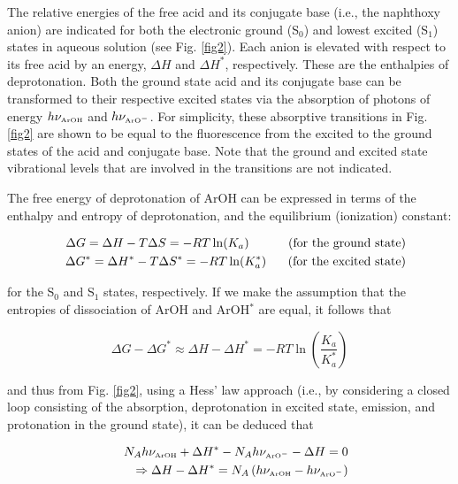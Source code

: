 \documentclass[byrevtex,amssymb,aps,pra,floatfix,letterpaper]{revtex4}
\begin{document}
The relative energies of the free acid and its conjugate base (i.e., the naphthoxy anion) are indicated for both the electronic ground (S$_0$) and lowest excited (S$_1$) states in aqueous solution (see Fig. \ref{fig2}). Each anion is elevated with respect to its free acid by an energy, $\Delta H$ and $\Delta H^*$, respectively. These are the enthalpies of deprotonation. Both the ground state acid and its conjugate base can be transformed to their respective excited states via the absorption of photons of energy $h\nu_\textnormal{\tiny ArOH}$ and $h\nu_{\textnormal{\tiny ArO}^-}$. For simplicity, these absorptive transitions in Fig. \ref{fig2} are shown to be equal to the fluorescence from the excited to the ground states of the acid and conjugate base. Note that the ground and excited state vibrational levels that are involved in the transitions are not indicated.

The free energy of deprotonation of ArOH can be expressed in terms of the enthalpy and entropy of deprotonation, and the equilibrium (ionization) constant:

\begin{eqnarray}
\label{eq2}
& & \Delta G = \Delta H - T\Delta S = -RT\ln(K_a)\textnormal{ \hspace{1cm}(for the ground state)}\\
\nonumber
& & \Delta G^* = \Delta H^* - T\Delta S^* = -RT\ln(K_a^*)\textnormal{ \hspace{0.5cm}(for the excited state)}
\end{eqnarray}

\noindent
for the S$_0$ and S$_1$ states, respectively. If we make the assumption that the entropies of dissociation of ArOH and ArOH$^*$ are equal, it follows that

\begin{equation}
\label{eq3}
\Delta G - \Delta G^* \approx \Delta H - \Delta H^* = -RT\ln\left(\frac{K_a}{K_a^*}\right)
\end{equation}

\noindent
and thus from Fig. \ref{fig2}, using a Hess' law approach (i.e., by considering a closed loop consisting of the absorption, deprotonation in excited state, emission, and protonation in the ground state), it can be deduced that

\begin{eqnarray}
\label{eq4}
& & N_Ah\nu_\textnormal{\tiny ArOH} + \Delta H^* - N_Ah\nu_{\textnormal{\tiny ArO}^-} - \Delta H = 0\\
\nonumber
& & \Rightarrow \Delta H - \Delta H^* = N_A\left(h\nu_\textnormal{\tiny ArOH} - h\nu_{\textnormal{\tiny ArO}^-}\right)
\end{eqnarray}
\end{document}
